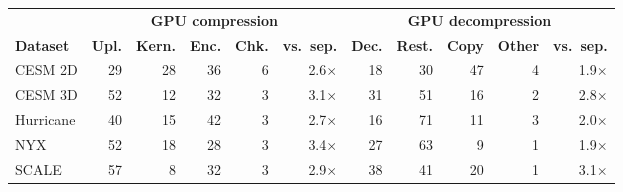\begin{tabular}{@{}lrrrrrrrrrr@{}}
\toprule
 & \multicolumn{5}{c}{\textbf{GPU compression}} & \multicolumn{5}{c}{\textbf{GPU decompression}} \\
\cmidrule(lr){2-6}\cmidrule(lr){7-11}
\textbf{Dataset} & \textbf{Upl.} & \textbf{Kern.} & \textbf{Enc.} & \textbf{Chk.} & \textbf{vs.\ sep.} & \textbf{Dec.} & \textbf{Rest.} & \textbf{Copy} & \textbf{Other} & \textbf{vs.\ sep.} \\
\midrule
CESM 2D & 29 & 28 & 36 & 6 & 2.6$\times$ & 18 & 30 & 47 & 4 & 1.9$\times$ \\
CESM 3D & 52 & 12 & 32 & 3 & 3.1$\times$ & 31 & 51 & 16 & 2 & 2.8$\times$ \\
Hurricane & 40 & 15 & 42 & 3 & 2.7$\times$ & 16 & 71 & 11 & 3 & 2.0$\times$ \\
NYX & 52 & 18 & 28 & 3 & 3.4$\times$ & 27 & 63 & 9 & 1 & 1.9$\times$ \\
SCALE & 57 & 8 & 32 & 3 & 2.9$\times$ & 38 & 41 & 20 & 1 & 3.1$\times$ \\
\bottomrule
\end{tabular}
